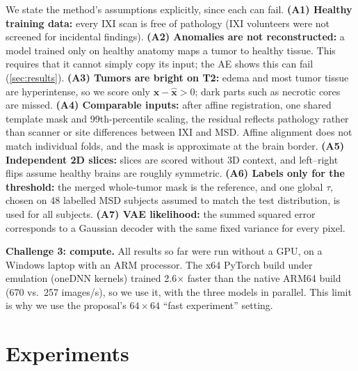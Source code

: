 \documentclass{article}
\begin{document}
We state the method's assumptions explicitly, since each can fail.
\textbf{(A1) Healthy training data:} every IXI scan is free of pathology (IXI
volunteers were not screened for incidental findings).
\textbf{(A2) Anomalies are not reconstructed:} a model trained only on healthy
anatomy maps a tumor to healthy tissue. This requires that it cannot simply
copy its input; the AE shows this can fail (\cref{sec:results}).
\textbf{(A3) Tumors are bright on T2:} edema and most tumor tissue are
hyperintense, so we score only $\mathbf{x}-\hat{\mathbf{x}}>0$; dark parts such
as necrotic cores are missed.
\textbf{(A4) Comparable inputs:} after affine registration, one shared template
mask and 99th-percentile scaling, the residual reflects pathology rather than
scanner or site differences between IXI and MSD. Affine alignment does not match
individual folds, and the mask is approximate at the brain border.
\textbf{(A5) Independent 2D slices:} slices are scored without 3D context, and
left--right flips assume healthy brains are roughly symmetric.
\textbf{(A6) Labels only for the threshold:} the merged whole-tumor mask is the
reference, and one global $\tau$, chosen on 48 labelled MSD subjects assumed to
match the test distribution, is used for all subjects.
\textbf{(A7) VAE likelihood:} the summed squared error corresponds to a Gaussian
decoder with the same fixed variance for every pixel.

\textbf{Challenge 3: compute.} All results so far were run without a GPU, on a
Windows laptop with an ARM processor. The x64 PyTorch build under emulation
(oneDNN kernels) trained 2.6$\times$ faster than the native ARM64 build (670 vs.\
257 images/s), so we use it, with the three models in parallel. This limit is why
we use the proposal's $64\times64$ ``fast experiment'' setting.

\section{Experiments}
\end{document}
